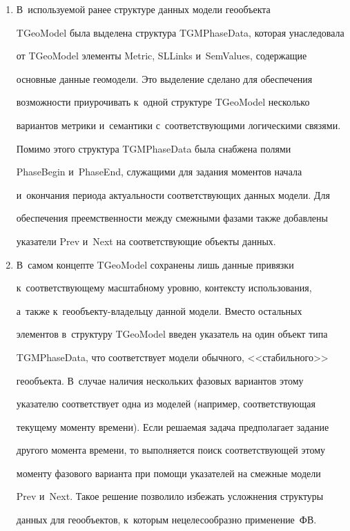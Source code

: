   \begin{enumerate}[1.]


  \item В~используемой ранее структуре данных модели геообъекта 


TGeoModel была выделена структура TGMPhaseData, которая унаследовала 


от \mbox{TGeoModel} элементы Metric, SLLinks и~SemValues, содержащие 


основные данные геомодели. Это выделение сделано для обеспечения 


возможности приурочивать к~одной структуре TGeoModel несколько 


вариантов мет\-ри\-ки и~семантики с~со\-от\-вет\-ст\-ву\-ющи\-ми логическими связями. 


  


  Помимо этого структура TGMPhaseData была снабжена полями 


PhaseBegin и~PhaseEnd, служащими для задания моментов начала 


и~окончания периода актуальности со\-от\-вет\-ст\-ву\-ющих данных модели. Для 


обеспечения пре\-емст\-вен\-ности между смежными фазами также добавлены 


указатели Prev и~Next на со\-от\-вет\-ст\-ву\-ющие объекты данных. 


  \item  В~самом концепте TGeoModel сохранены лишь данные привязки 


к~со\-от\-вет\-ст\-ву\-юще\-му мас\-штаб\-но\-му уров\-ню, контексту использования, 


а~также к~гео\-объ\-ек\-ту-вла\-дель\-цу данной модели. Вместо остальных 


элементов в~структуру TGeoModel введен указатель на один объект типа 


TGMPhaseData, что соответствует модели обычного, <<стабильного>> 


геообъекта. В~случае наличия нескольких фазовых вариантов этому 


указателю соответствует одна из моделей (например, соответствующая 


текущему моменту времени). Если ре\-ша\-емая задача предполагает задание 


другого момента времени, то выполняется поиск со\-от\-вет\-ст\-ву\-ющей этому 


моменту фазового варианта при помощи указателей на смеж\-ные модели 


Prev и~Next. Такое решение позволило избежать услож\-не\-ния структуры 


данных для геообъектов, к~которым нецелесообразно применение~ФВ.


  \end{enumerate}


